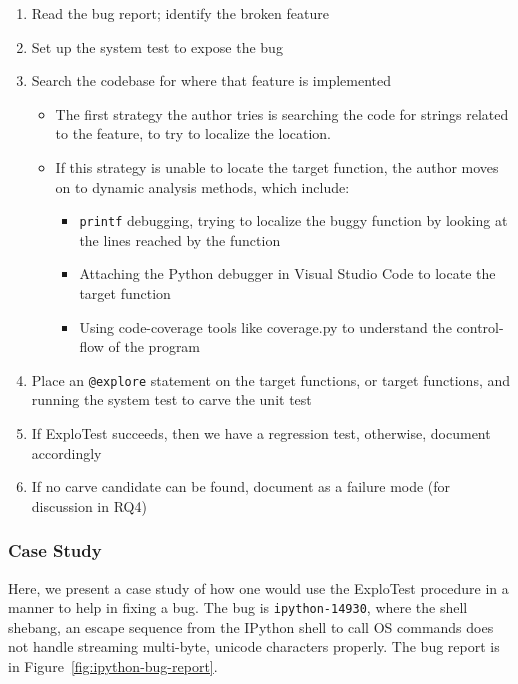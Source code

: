 \begin{enumerate}[label=Step \arabic*]
    \item Read the bug report; identify the broken feature
    \item Set up the system test to expose the bug
    \item Search the codebase for where that feature is implemented
          \begin{itemize}
              \item The first strategy the author tries is searching the code for strings related to the feature, to try to localize the location.
              \item If this strategy is unable to locate the target function, the author moves on to dynamic analysis methods, which include:
                    \begin{itemize}
                        \item \texttt{printf} debugging, trying to localize the buggy function by looking at the lines reached by the function
                        \item Attaching the Python debugger in Visual Studio Code to locate the target function
                        \item Using code-coverage tools like coverage.py to understand the control-flow of the program
                    \end{itemize}
          \end{itemize}
    \item Place an \verb|@explore| statement on the target functions, or target functions, and running the system test to carve the unit test
    \item If ExploTest succeeds, then we have a regression test, otherwise, document accordingly
    \item If no carve candidate can be found, document as a failure mode (for discussion in RQ4)



\end{enumerate}


\subsubsection{Case Study}

Here, we present a case study of how one would use the ExploTest procedure in a manner to help in fixing a bug. The bug is \verb|ipython-14930|, where
the shell shebang, an escape sequence from the IPython shell to call OS commands does not handle streaming multi-byte, unicode characters properly.
The bug report is in Figure~\ref{fig:ipython-bug-report}.

